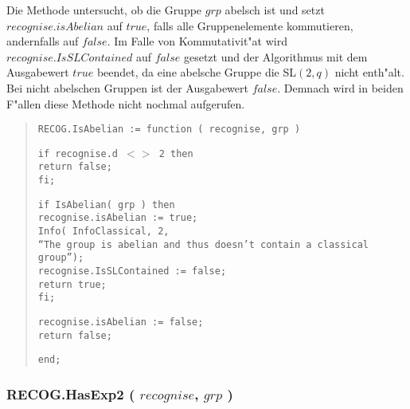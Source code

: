 \documentclass[a4paper,11pt]{article}
\theoremstyle{bla}
\begin{document}
Die Methode untersucht, ob die Gruppe $grp$ abelsch ist und setzt $recognise.isAbelian$ auf $true$, falls alle Gruppenelemente kommutieren, andernfalls auf $false$. Im Falle von Kommutativit"at wird $recognise.IsSLContained$ auf $false$ gesetzt und der Algorithmus mit dem Ausgabewert $true$ beendet, da eine abelsche Gruppe die \textrm{SL}$(2,q)$ nicht enth"alt. Bei nicht abelschen Gruppen ist der Ausgabewert $false$. Demnach wird in beiden F"allen diese Methode nicht nochmal aufgerufen.

\begin{quote}
\hspace*{-0.3cm} \texttt{RECOG.IsAbelian := function ( recognise, grp )}

  \texttt{if recognise.d $<>$ 2 then}\\
    \hspace*{0.3cm} \texttt{return false;}\\
  \texttt{fi;}

  \texttt{if IsAbelian( grp ) then}\\
    \hspace*{0.3cm} \texttt{recognise.isAbelian := true;}\\
    \hspace*{0.3cm} \texttt{Info( InfoClassical, 2,}\\
    \hspace*{0.3cm} \texttt{``The group is abelian and thus doesn't contain a classical group'');}\\
    \hspace*{0.3cm} \texttt{recognise.IsSLContained := false;}\\
    \hspace*{0.3cm} \texttt{return true;}\\
  \texttt{fi;}

  \texttt{recognise.isAbelian := false;}\\
  \texttt{return false;}

\hspace*{-0.3cm} \texttt{end;}
\end{quote}


\subsubsection{RECOG.HasExp2 ( $recognise$, $grp$ )}\label{exp}
\end{document}
